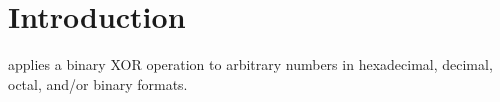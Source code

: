 \section{Introduction}

 applies a binary XOR operation to arbitrary numbers in hexadecimal, decimal, octal, and/or binary formats.
